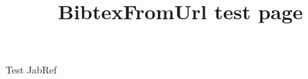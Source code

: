 \documentclass[12pt,a4paper]{article}
\begin{document}
\title{BibtexFromUrl test page}

\maketitle

Test\cite{test1} \cite{test2} \cite{select} JabRef~\cite{JabRe89:online}


\raggedright

\end{document}
